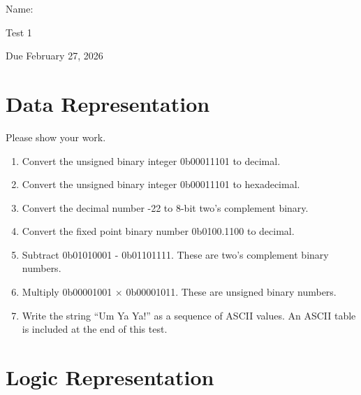 \documentclass[12pt]{article}
\begin{document}
Name: \makebox[3in]{\hrulefill
\hrulefill}

\vfill

\begin{center}
{\huge Test 1}

{\large Due February 27, 2026}
\end{center}

\testrules

\vfill

\pledge

\newpage

\section*{Data Representation}

Please show your work.




\begin{enumerate}
\item Convert the unsigned binary integer 0b00011101 to decimal.
\vfill

\item Convert the unsigned binary integer 0b00011101 to hexadecimal.
\vfill


\item Convert the decimal number -22 to 8-bit two's complement binary.
\vfill

\item Convert the fixed point binary number 0b0100.1100 to decimal.
\vfill

\pagebreak
\item Subtract 0b01010001 - 0b01101111. These are two's complement binary numbers.
\vfill
\item Multiply 0b00001001 $\times$ 0b00001011. These are unsigned binary numbers.
\vfill
\item Write the string ``Um Ya Ya!'' as a sequence of ASCII values. An ASCII table is included at the end of this test.
\vfill
\end{enumerate}

\vfill

\standardsfooter


\newpage

\section*{Logic Representation}
\end{document}
